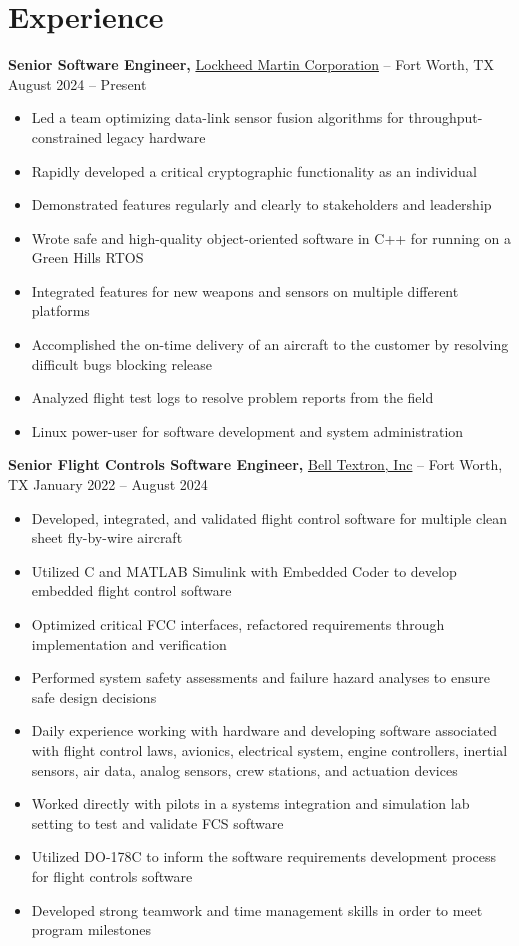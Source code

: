 \documentclass[11pt]{article}       %
\begin{document}
\section*{Experience}
\textbf{Senior Software Engineer,} \href{https://www.lockheedmartin.com/}{Lockheed Martin Corporation} -- Fort Worth, TX \hfill August 2024 -- Present \\
\vspace{-9pt}
\begin{itemize}
  \item Led a team optimizing data-link sensor fusion algorithms for throughput-constrained legacy hardware
  \item Rapidly developed a critical cryptographic functionality as an individual
  \item Demonstrated features regularly and clearly to stakeholders and leadership
  \item Wrote safe and high-quality object-oriented software in C++ for running on a Green Hills RTOS
  \item Integrated features for new weapons and sensors on multiple different platforms
  \item Accomplished the on-time delivery of an aircraft to the customer by resolving difficult bugs blocking release
  \item Analyzed flight test logs to resolve problem reports from the field
  \item Linux power-user for software development and system administration

\end{itemize}

\textbf{Senior Flight Controls Software Engineer,} \href{https://www.bellflight.com/}{Bell Textron, Inc} -- Fort Worth, TX \hfill January 2022 -- August 2024 \\
\vspace{-9pt}
\begin{itemize}
  \item Developed, integrated, and validated flight control software for multiple clean sheet fly-by-wire aircraft
  \item Utilized C and MATLAB Simulink with Embedded Coder to develop embedded flight control software
  \item Optimized critical FCC interfaces, refactored requirements through implementation and verification
  \item Performed system safety assessments and failure hazard analyses to ensure safe design decisions
  \item Daily experience working with hardware and developing software associated with flight control laws, avionics, electrical system, engine controllers, inertial sensors, air data, analog sensors, crew stations, and actuation devices
  \item Worked directly with pilots in a systems integration and simulation lab setting to test and validate FCS software
  \item Utilized DO-178C to inform the software requirements development process for flight controls software
  \item Developed strong teamwork and time management skills in order to meet program milestones
\end{itemize}
\end{document}
